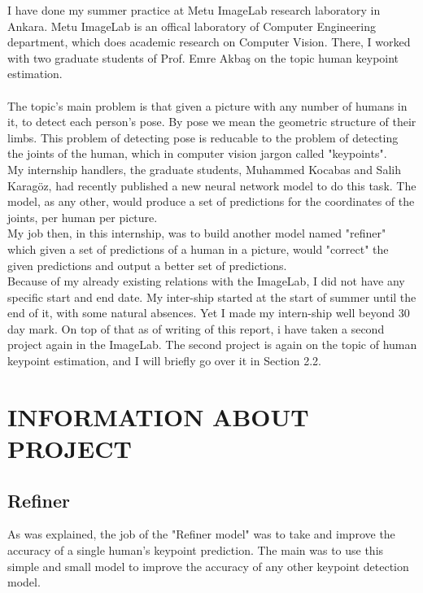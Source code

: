 \documentclass[titlepage, a4paper, 14pt]{extarticle} %
\begin{document}
I have done my summer practice at Metu ImageLab research laboratory in Ankara. Metu ImageLab is an offical laboratory of Computer Engineering department, which does academic research on Computer Vision. There, I worked with two graduate students of Prof. Emre Akbaş on the topic human keypoint estimation. \\\\

The topic's main problem is that given a picture with any number of humans in it, to detect each person's pose. By pose we mean the geometric structure of their limbs. This problem of detecting pose is reducable to the problem of detecting the joints of the human, which in computer vision jargon called "keypoints". \\

My internship handlers, the graduate students, Muhammed Kocabas and Salih Karagöz, had recently published a new neural network model to do this task. The model, as any other, would produce a set of predictions for the coordinates of the joints, per human per picture. \\

My job then, in this internship, was to build another model named "refiner" which given a set of predictions of a human in a picture, would "correct" the given predictions and output a better set of predictions.\\

Because of my already existing relations with  the ImageLab, I did not have any specific start and end date. My inter-ship started at the start of summer until the end of it, with some natural absences. Yet I made my intern-ship well beyond 30 day mark. On top of that as of writing of this report, i have taken a second project again in the ImageLab. The second project is again on the topic of human keypoint estimation, and I will briefly go over it in Section 2.2.


\section{INFORMATION ABOUT PROJECT} \label{info}


\subsection{Refiner} \label{refiner}

As was explained, the job of the "Refiner model" was to take and improve the accuracy of a single human's keypoint prediction. The main was to use this simple and small model to improve the accuracy of any other keypoint detection model. \\
\end{document}
